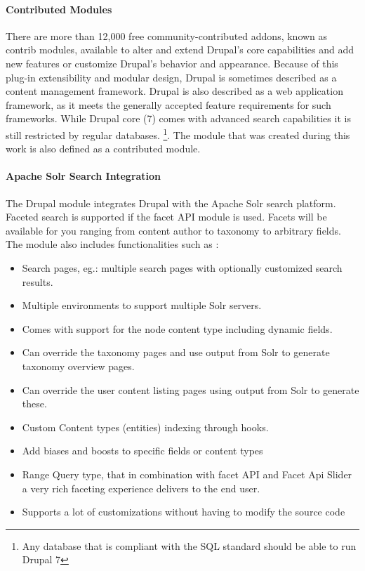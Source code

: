 \paragraph{Contributed Modules}
There are more than 12,000 free community-contributed addons, known as contrib modules, available to alter and extend Drupal's core capabilities and add new features or customize Drupal's behavior and appearance. Because of this plug-in extensibility and modular design, Drupal is sometimes described as a content management framework. Drupal is also described as a web application framework, as it meets the generally accepted feature requirements for such frameworks.
While Drupal core (7) comes with advanced search capabilities it is still restricted by regular databases. \footnote{Any database that is compliant with the SQL standard should be able to run Drupal 7}. The module that was created during this work is also defined as a contributed module.

\paragraph{Apache Solr Search Integration}
The Drupal module integrates Drupal with the Apache Solr search platform. Faceted search is supported if the facet API module is used. Facets will be available for you ranging from content author to taxonomy to arbitrary fields. The module also includes functionalities such as :
\begin{itemize}
  \item Search pages, eg.: multiple search pages with optionally customized search results.
  \item Multiple environments to support multiple Solr servers.
  \item Comes with support for the node content type including dynamic fields.
  \item Can override the taxonomy pages and use output from Solr to generate taxonomy overview pages.
  \item Can override the user content listing pages using output from Solr to generate these.
  \item Custom Content types (entities) indexing through hooks.
  \item Add biases and boosts to specific fields or content types
  \item Range Query type, that in combination with facet API and Facet Api Slider a very rich faceting experience delivers to the end user.
  \item Supports a lot of customizations without having to modify the source code
\end{itemize}




